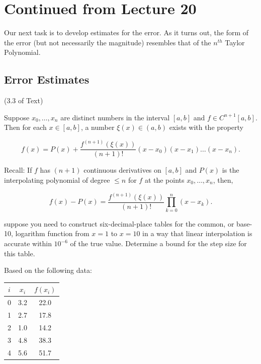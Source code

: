 \section{Continued from Lecture 20}

Our next task is to develop estimates for the error. As it turns out, the form
of the error (but not necessarily the magnitude) resembles that of the $n^{th}$
Taylor Polynomial.

\subsection{Error Estimates}

\thm (3.3 of Text)

Suppose $x_0, \dots, x_n$ are distinct numbers in the interval $[a,b]$ and
$f\in C^{n+1}[a,b]$. Then for each $x\in [a,b]$, a number $\xi(x)\in(a,b)$
exists with the property

\[
  f(x) = P(x) + \frac{f^{(n+1)}(\xi(x))}{(n+1)!} (x-x_0) (x-x_1) \dots (x-x_n)
.\]

\begin{center}
\end{center}

Recall: If $f$ has $(n+1)$ continuous derivatives on $[a,b]$ and $P(x)$ is the 
interpolating polynomial of degree $\leq n$ for $f$ at the points 
$x_0, \dots, x_n$, then,

\[
  f(x) - P(x) = \frac{f^{(n+1)}(\xi (x))}{(n+1)!} \prod_{k=0}^{n} (x-x_k)
.\]

\Ex suppose you need to construct six-decimal-place tables for the common, or
base-10, logarithm function from $x=1$ to $x=10$ in a way that linear 
interpolation is accurate within $10^{-6}$ of the true value. Determine a bound
for the step size for this table.

Based on the following data:

\begin{table}[h]
    \centering
    \begin{tabular}{c c c}
        \toprule
        $i$ & $x_i$ & $f(x_i)$ \\
        \midrule
        0 & 3.2 & 22.0 \\
        1 & 2.7 & 17.8 \\
        2 & 1.0 & 14.2 \\
        3 & 4.8 & 38.3 \\
        4 & 5.6 & 51.7 \\
        \bottomrule
    \end{tabular}
\end{table}

